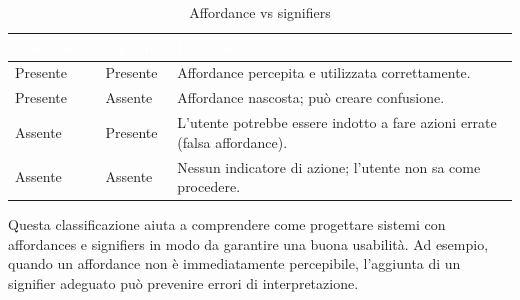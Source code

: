 \begin{table}[ht]
\centering
{}
\begin{tabular}{|p{2.5cm}|p{2.5cm}|p{9cm}|}
\hline
\rowcolor{headerblue}
\textbf{\textcolor{white}{Affordance}} & \textbf{\textcolor{white}{Signifier}} & \textbf{\textcolor{white}{Risultato}}\\\hline
Presente & Presente & Affordance percepita e utilizzata correttamente.\\\hline
Presente & Assente & Affordance nascosta; può creare confusione.\\\hline
Assente & Presente & L'utente potrebbe essere indotto a fare azioni errate (falsa affordance).\\\hline
Assente & Assente & Nessun indicatore di azione; l’utente non sa come procedere.\\\hline
\end{tabular}
\caption{Affordance vs signifiers}
\label{tab:affordance-signifier}
\end{table}

Questa classificazione aiuta a comprendere come progettare sistemi con affordances e signifiers in modo da garantire una buona usabilità. Ad esempio, quando un affordance non è immediatamente percepibile, l'aggiunta di un signifier adeguato può prevenire errori di interpretazione.

